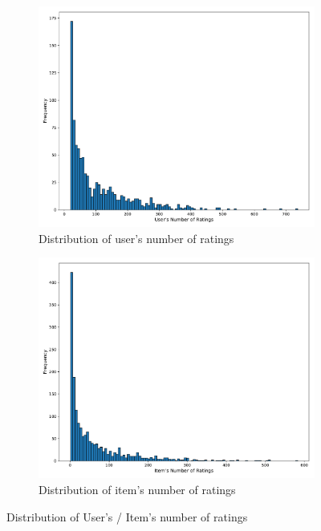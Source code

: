\begin{figure}[htbp]
\centering
\begin{subfigure}[b]{0.5\linewidth}
  \includegraphics[width=1.00\textwidth]{./figures/user_frequency.pdf}
  \caption{Distribution of user's number of ratings}
   \label{ex_without_source}
\end{subfigure}%
\begin{subfigure}[b]{0.5\linewidth}
  \centering
  \includegraphics[width=1.00\textwidth]{./figures/item_frequency.pdf}
  \caption{Distribution of item's number of ratings}
  \label{ex_with_source}
\end{subfigure}%
\raggedright
\caption{Distribution of User's / Item's number of ratings}
\label{fig:source_injection}
\end{figure}



